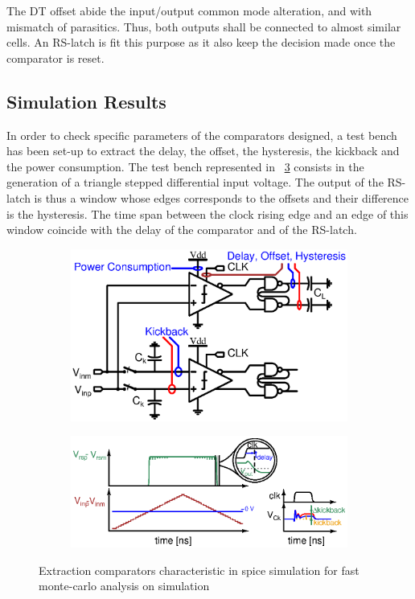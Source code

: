 The DT offset abide the input/output common mode alteration, and with mismatch of parasitics. Thus, both outputs shall be connected to almost similar cells. An RS-latch is fit this purpose as it also keep the decision made once the comparator is reset.

    \subsection{Simulation Results}              %
\label{sec:latches_sim}
In order to check specific parameters of the comparators designed, a test bench has been set-up to extract the delay, the offset, the hysteresis, the kickback and the power consumption. The test bench represented in \figurename~\ref{fig:cmp_testbench} consists in the generation of a triangle stepped differential input voltage. The output of the RS-latch is thus a window whose edges corresponds to the offsets and their difference is the hysteresis. The time span between the clock rising edge and an edge of this window coincide with the delay of the comparator and of the RS-latch. 

\begin{figure}[htp]
    \centering
    \begin{subfigure}[b]{0.40\textwidth}
        \centering
        \includegraphics[width=\textwidth]{Chapter7/Figs/cmp_tb.ps}
        \label{fig:cmp_tb}
    \end{subfigure}
    \begin{subfigure}[b]{0.58\textwidth}
        \centering
        \includegraphics[width=\textwidth]{Chapter7/Figs/cmp_tb_signals.ps}
        \label{fig:test_signals}
    \end{subfigure}
    \caption{Extraction comparators characteristic in spice simulation for fast monte-carlo analysis on simulation}
    \label{fig:cmp_testbench}
\end{figure}

